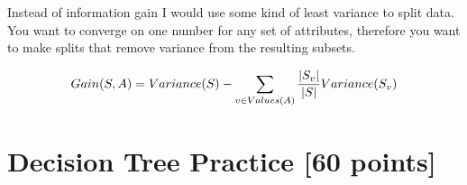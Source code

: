 \documentclass[12pt, fullpage,letterpaper]{article}
\begin{document}
\begin{enumerate}
\begin{framed}
	  \newline
	Instead of information gain I would use some kind of least variance to split data. You want to converge on one number for any set of attributes, therefore you want to make splits that remove variance from the resulting subsets. 
	
	$$Gain(S, A) = Variance(S) - \sum_{v \in Values(A)}^{}\frac{\lvert S_v\rvert}{\lvert S\rvert}Variance(S_v)$$
	
\end{framed}

\end{enumerate}

\section{Decision Tree Practice [60 points]}
\end{document}
